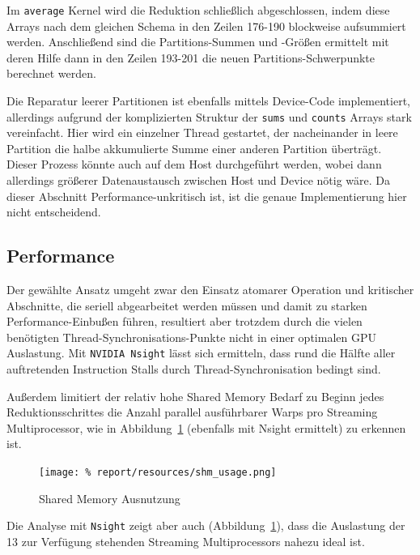 \documentclass[
    bibliography=totoc, cd=lightcolor, cdmath=false, ngerman]{tudscrreprt}
\begin{document}
\vspace{20pt}

Im \texttt{average} Kernel wird die Reduktion schließlich abgeschlossen, indem
diese Arrays nach dem gleichen Schema in den Zeilen 176-190 blockweise
aufsummiert werden. Anschließend sind die Partitions-Summen und -Größen
ermittelt mit deren Hilfe dann in den Zeilen 193-201 die neuen
Partitions-Schwerpunkte berechnet werden.

Die Reparatur leerer Partitionen ist ebenfalls mittels Device-Code
implementiert, allerdings aufgrund der komplizierten Struktur der \texttt{sums}
und \texttt{counts} Arrays stark vereinfacht. Hier wird ein einzelner Thread
gestartet, der nacheinander in leere Partition die halbe akkumulierte Summe
einer anderen Partition überträgt. Dieser Prozess könnte auch auf dem Host
durchgeführt werden, wobei dann allerdings größerer Datenaustausch zwischen
Host und Device nötig wäre. Da dieser Abschnitt Performance-unkritisch ist, ist
die genaue Implementierung hier nicht entscheidend.

\subsection{Performance}

Der gewählte Ansatz umgeht zwar den Einsatz atomarer Operation und kritischer
Abschnitte, die seriell abgearbeitet werden müssen und damit zu starken
Performance-Einbußen führen, resultiert aber trotzdem durch die vielen
benötigten Thread-Synchronisations-Punkte nicht in einer optimalen GPU
Auslastung. Mit \texttt{NVIDIA Nsight} lässt sich ermitteln, dass rund die
Hälfte aller auftretenden Instruction Stalls durch Thread-Synchronisation
bedingt sind.

Außerdem limitiert der relativ hohe Shared Memory Bedarf zu Beginn
jedes Reduktionsschrittes die Anzahl parallel ausführbarer Warps pro Streaming
Multiprocessor, wie in Abbildung~\ref{fig:shm} (ebenfalls mit Nsight ermittelt)
zu erkennen ist.

\begin{figure}[htbp]
  \begin{center}
    \texttt{[image: \%
    report/resources/shm\_usage.png]}
  \end{center}
  \caption{Shared Memory Ausnutzung}
  \label{fig:shm}
\end{figure}

Die Analyse mit \texttt{Nsight} zeigt aber auch (Abbildung~\ref{fig:shm}), dass
die Auslastung der 13 zur Verfügung stehenden Streaming Multiprocessors
nahezu ideal ist.
\end{document}
